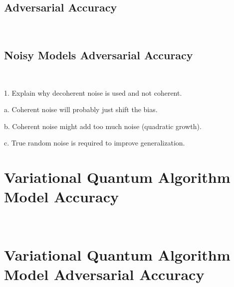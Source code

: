 \subsection{Adversarial Accuracy}\label{subsection:plus-minus-cancer-adv-acc} \

\subsection{Noisy Models Adversarial Accuracy}\label{subsection:plus-minus-cancer-noisy-adv-acc} \


1.	Explain why decoherent noise is used and not coherent. \

  a. Coherent noise will probably just shift the bias. \

  b. Coherent noise might add too much noise (quadratic growth). \

  c. True random noise is required to improve generalization. \


\section{Variational Quantum Algorithm Model Accuracy}\label{section:vqa_accuracy} \


\section{Variational Quantum Algorithm Model Adversarial Accuracy}\label{section:vqa_adversarial_accuracy} \

